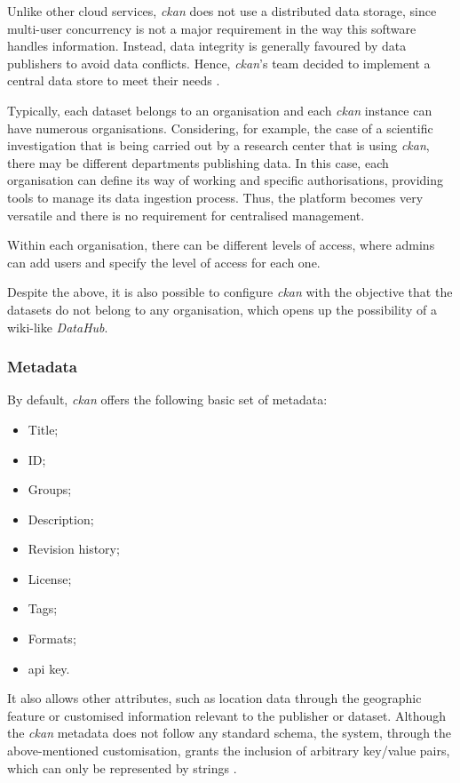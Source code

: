 Unlike other cloud services, \textit{\gls{ckan}} does not use a distributed data storage, since multi-user concurrency is not a major requirement in the way this software handles information. Instead, data integrity is generally favoured by data publishers to avoid data conflicts. Hence, \textit{\gls{ckan}}'s team decided to implement a central data store to meet their needs \citep{8}.
  
Typically, each dataset belongs to an organisation and each \textit{\gls{ckan}} instance can have numerous organisations. Considering, for example, the case of a scientific investigation that is being carried out by a research center that is using \textit{\gls{ckan}}, there may be different departments publishing data. In this case, each organisation can define its way of working and specific authorisations, providing tools to manage its data ingestion process. Thus, the platform becomes very versatile and there is no requirement for centralised management.
  
Within each organisation, there can be different levels of access, where admins can add users and specify the level of access for each one.
  
Despite the above, it is also possible to configure \textit{\gls{ckan}} with the objective that the datasets do not belong to any organisation, which opens up the possibility of a wiki-like \textit{DataHub}.
  
\subsubsection{Metadata}
  
By default, \textit{\gls{ckan}} offers the following basic set of metadata:

\begin{itemize}
  \item Title;
  \item ID;
  \item Groups;
  \item Description;
  \item Revision history;
  \item License;
  \item Tags;
  \item Formats;
  \item \gls{api} key.
\end{itemize}
  
It also allows other attributes, such as location data through the geographic feature or customised information relevant to the publisher or dataset. Although the \textit{\gls{ckan}} metadata does not follow any standard schema, the system, through the above-mentioned customisation, grants the inclusion of arbitrary key/value pairs, which can only be represented by strings \citep{1}.
  
